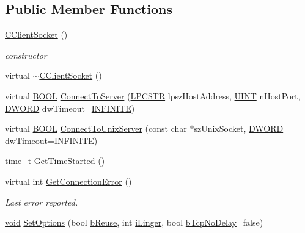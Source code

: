 \subsection*{\-Public \-Member \-Functions}
\begin{DoxyCompactItemize}
\item 
\hyperlink{class_c_client_socket_a45648796359fcb9e67ac9ba9d8ab6879}{\-C\-Client\-Socket} ()
\begin{DoxyCompactList}\small\item\em constructor \end{DoxyCompactList}\item 
virtual \hyperlink{class_c_client_socket_ad9df1bce627d694f3786d801c57eea3c}{$\sim$\-C\-Client\-Socket} ()
\item 
virtual \hyperlink{_cpclient_8h_a3be13892ae7076009afcf121347dd319}{\-B\-O\-O\-L} \hyperlink{class_c_client_socket_ae9e27a8e37cb259cbb37357d763fe9db}{\-Connect\-To\-Server} (\hyperlink{_x_plat_8h_a2b72c6037793f6c6381a09c83f27569b}{\-L\-P\-C\-S\-T\-R} lpsz\-Host\-Address, \hyperlink{_x_plat_8h_a45c20c14d3d8790a22153d08ab2eb2ff}{\-U\-I\-N\-T} n\-Host\-Port, \hyperlink{_x_plat_8h_aa39b39d94407451a6ec0226479db68cf}{\-D\-W\-O\-R\-D} dw\-Timeout=\hyperlink{_x_plat_8h_aa84a29002ab81c719c0d07bb446296e0}{\-I\-N\-F\-I\-N\-I\-T\-E})
\item 
virtual \hyperlink{_cpclient_8h_a3be13892ae7076009afcf121347dd319}{\-B\-O\-O\-L} \hyperlink{class_c_client_socket_a0967869371faa1328e38f9f83d4e9254}{\-Connect\-To\-Unix\-Server} (const char $\ast$sz\-Unix\-Socket, \hyperlink{_x_plat_8h_aa39b39d94407451a6ec0226479db68cf}{\-D\-W\-O\-R\-D} dw\-Timeout=\hyperlink{_x_plat_8h_aa84a29002ab81c719c0d07bb446296e0}{\-I\-N\-F\-I\-N\-I\-T\-E})
\item 
time\-\_\-t \hyperlink{class_c_client_socket_acc44530fac9dd8dc3c648c7a32365750}{\-Get\-Time\-Started} ()
\item 
virtual int \hyperlink{class_c_client_socket_a9ac6b495a4429b4f876f939e0e662104}{\-Get\-Connection\-Error} ()
\begin{DoxyCompactList}\small\item\em \-Last error reported. \end{DoxyCompactList}\item 
\hyperlink{_cpclient_8h_a6464f7480a0fd0ee170cba12b2c0497f}{void} \hyperlink{class_c_client_socket_a45520b4cfcf758dc003877853acf47f7}{\-Set\-Options} (bool \hyperlink{class_c_client_socket_a637cd103e13587df34c0d1937e95aefa}{b\-Reuse}, int \hyperlink{class_c_client_socket_af33729182418c1e9868ad0fed1a68a1e}{i\-Linger}, bool \hyperlink{class_c_client_socket_a0b7201c5883116b700d19bcfc61e49c5}{b\-Tcp\-No\-Delay}=false)
\end{DoxyCompactItemize}
